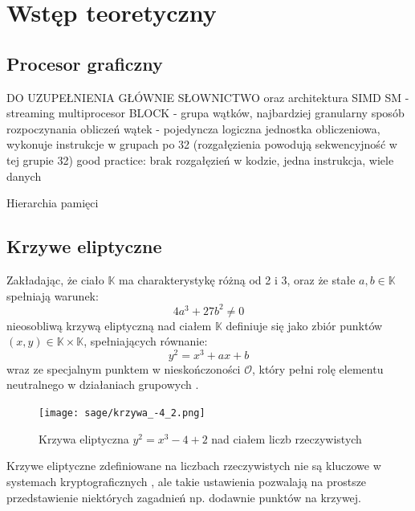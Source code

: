 \newpage %
\section{Wstęp teoretyczny}


\subsection{Procesor graficzny}
DO UZUPEŁNIENIA
GŁÓWNIE SŁOWNICTWO oraz architektura SIMD
SM - streaming multiprocesor
BLOCK - grupa wątków, najbardziej granularny sposób rozpoczynania obliczeń
wątek - pojedyncza logiczna jednostka obliczeniowa, wykonuje instrukcje w grupach po 32
(rozgałęzienia powodują sekwencyjność w tej grupie 32) 
good practice: brak rozgałęzień w kodzie, jedna instrukcja, wiele danych

Hierarchia pamięci

\subsection{Krzywe eliptyczne}
Zakładając, że ciało $\mathbb{K}$ ma charakterystykę różną od 2 i 3,
oraz że stałe $a, b \in \mathbb{K}$ spełniają warunek:
\[4a^3 + 27b^2 \neq 0\]
nieosobliwą krzywą eliptyczną nad ciałem $\mathbb{K}$ definiuje się jako zbiór punktów $(x,y) \in \mathbb{K} \times \mathbb{K}$,
spełniających równanie:
\[y^2 = x^3 + ax + b\]
wraz ze specjalnym punktem w nieskończoności $\mathcal{O}$, który pełni rolę elementu neutralnego
w działaniach grupowych
\cite{Stinson2021}.
\begin{figure}[H]
    \centering \texttt{[image: sage/krzywa\_-4\_2.png]}
    \caption{Krzywa eliptyczna $y^2=x^3-4+2$ nad ciałem liczb rzeczywistych}
\end{figure}

Krzywe eliptyczne zdefiniowane na liczbach rzeczywistych nie są kluczowe w
systemach kryptograficznych \cite*{Stinson2021}, ale takie ustawienia
pozwalają na prostsze przedstawienie niektórych zagadnień
np. dodawnie punktów na krzywej.


